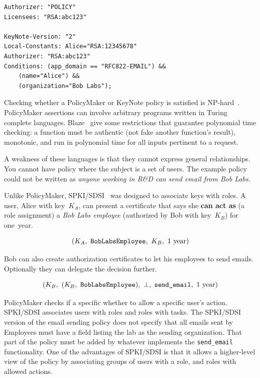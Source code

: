 \documentclass[thesis.tex]{subfiles}
\begin{document}
\begin{lstlisting}
Authorizer: "POLICY"
Licensees: "RSA:abc123"

KeyNote-Version: "2"
Local-Constants: Alice="RSA:12345678" 
Authorizer: "RSA:abc123"
Conditions: (app_domain == "RFC822-EMAIL") &&
    (name="Alice") &&
    (organization="Bob Labs");
\end{lstlisting}

Checking whether a PolicyMaker or KeyNote policy is satisfied is
NP-hard~\cite{blaze_compliance_1998}. PolicyMaker assertions can involve
arbitrary programs written in Turing complete languages. Blaze~\etal{} give some restrictions that
guarantee polynomial time checking: a function must be authentic (not fake
another function's result), monotonic, and run in polynomial time for all inputs
pertinent to a request.

A weakness of these languages is that they cannot express
general relationships. You cannot have policy where the subject is
a set of users.  The example policy could not be written as
\emph{anyone working in R\&D can send email from Bob Labs.}


Unlike PolicyMaker, SPKI/SDSI~\cite{ellison_spki_1999} was
designed to associate keys with roles.  A user, Alice with key~$K_A$,
can present a certificate that says she \textbf{can act as} (a role assignment) a \emph{Bob Labs
employee} (authorized by Bob with key~$K_B$) for one~year.

\begin{equation*}
  (K_A,~\text{\tt BobLabsEmployee},~K_B,~1~\text{year})
\end{equation*}

Bob can also create authorization certificates to let his employees
to send emails. Optionally they can delegate the decision further.

\begin{equation*}
 (K_B,~(K_B,~\text{\tt BobLabsEmployee}),~\bot,~\text{\ttfamily send\_email},~1~\text{year})
\end{equation*}

PolicyMaker checks if a specific whether to allow a specific user's action. SPKI/SDSI associates users with roles and
roles with tasks. The SPKI/SDSI version of the email sending policy does not
specify that all emails sent by Employees must have a field listing the lab as
the sending organization. That part of the policy must be added by
whatever implements the \texttt{send\_email} functionality. One of the
advantages of SPKI/SDSI is that it allows a higher-level view of the policy by
associating groups of users with a role, and roles with allowed actions.
\end{document}
